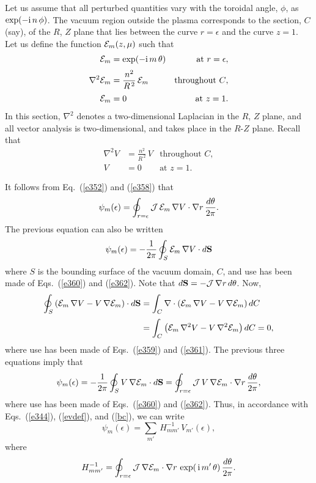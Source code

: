 \documentclass[12pt,prb,aps]{revtex4-1}
\begin{document}
Let us assume that all perturbed quantities vary with the toroidal angle, $\phi$, as $\exp(-{\rm i}\,n\,\phi)$. 
The vacuum region outside the plasma corresponds to the section, $C$ (say), of the $R$, $Z$ plane that lies between
the curve $r=\epsilon$ and the curve $z=1$. 
Let us define the function ${\cal E}_m(z,\mu)$ such that
\begin{align}\label{e358}
{\cal E}_m&= \exp(-{\rm i}\,m\,\theta) &\mbox{at $r=\epsilon$},\\[0.5ex]
\nabla^2{\cal E}_m &= \frac{n^2}{R^{\,2}}\,{\cal E}_m &\mbox{throughout $C$},\label{e359}\\[0.5ex]
{\cal E}_m &= 0& \mbox{at $z=1$}.\label{e360}
\end{align}
In this section, $\nabla^2$  denotes a two-dimensional Laplacian in the $R$, $Z$ plane, and all vector analysis is two-dimensional, and takes place in the $R$-$Z$ plane. 
Recall that
\begin{align}
\nabla^2 V &= \frac{n^2}{R^{\,2}}\,V &\mbox{throughout $C$},\label{e361}\\[0.5ex]
V&= 0& \mbox{at $z=1$}.\label{e362}
\end{align}

It follows from Eq.~(\ref{e352}) and (\ref{e358}) that
\begin{equation}
\psi_m(\epsilon) = \oint_{r=\epsilon}{\cal J}\,{\cal E}_m\,\nabla V\cdot \nabla r\,\frac{d\theta}{2\pi}.
\end{equation}
The previous equation can also be written
\begin{equation}
\psi_m (\epsilon)=-\frac{1}{2\pi} \oint_{S}{\cal E}_m\,\nabla V\cdot d{\bf S}
\end{equation}
where $S$ is the bounding surface of the vacuum domain, $C$, and use has been made of Eqs.~(\ref{e360}) and (\ref{e362}). 
Note that $d{\bf S} = - {\cal J}\,{\nabla}r\,d\theta$.
Now,
\begin{align}
\oint_S\left({\cal E}_m\,\nabla V-V\,\nabla{\cal E}_m\right)\cdot d{\bf S}&=
\int_C\nabla\cdot\left({\cal E}_m\,\nabla V -V\,\nabla{\cal E}_m\right)dC\nonumber\\[0.5ex]
&
=\int_C\left({\cal E}_m\,\nabla^2 V - V\,\nabla^2{\cal E}_m\right)dC = 0,
\end{align}
where use has been made of Eqs.~(\ref{e359}) and (\ref{e361}). The previous three equations imply that 
\begin{equation}
\psi_m(\epsilon) = -\frac{1}{2\pi} \oint_{S}V\,\nabla {\cal E}_m\cdot d{\bf S}=  \oint_{r=\epsilon}{\cal J}\,V\,\nabla {\cal E}_m\cdot \nabla r\,\frac{d\theta}{2\pi},
\end{equation}
where  use has been made of Eqs.~(\ref{e360}) and (\ref{e362}).
Thus, in accordance with Eqs.~(\ref{e344}), (\ref{evdef}), and (\ref{bc}), we can
write
\begin{equation}
\psi_m(\epsilon) = \sum_{m'}\,H_{mm'}^{-1}\,V_{m'}(\epsilon),
\end{equation}
where 
\begin{equation}\label{e368}
H_{mm'}^{-1}=\oint_{r=\epsilon}{\cal J}\,\nabla {\cal E}_m\cdot \nabla r\,\exp(\,{\rm i}\,m'\,\theta)\,\frac{d\theta}{2\pi}.
\end{equation}
\end{document}
